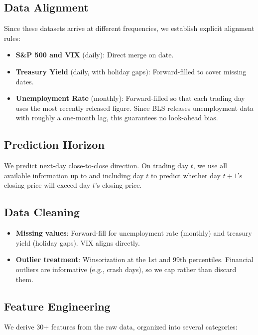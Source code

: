 \documentclass[11pt]{article}
\begin{document}
\subsection{Data Alignment}

Since these datasets arrive at different frequencies, we establish explicit alignment rules:

\begin{itemize}
    \item \textbf{S\&P 500 and VIX} (daily): Direct merge on date.
    \item \textbf{Treasury Yield} (daily, with holiday gaps): Forward-filled to cover missing dates.
    \item \textbf{Unemployment Rate} (monthly): Forward-filled so that each trading day uses the most recently released figure. Since BLS releases unemployment data with roughly a one-month lag, this guarantees no look-ahead bias.
\end{itemize}

\subsection{Prediction Horizon}

We predict next-day close-to-close direction. On trading day $t$, we use all available information up to and including day $t$ to predict whether day $t+1$'s closing price will exceed day $t$'s closing price.

\subsection{Data Cleaning}

\begin{itemize}
    \item \textbf{Missing values}: Forward-fill for unemployment rate (monthly) and treasury yield (holiday gaps). VIX aligns directly.
    \item \textbf{Outlier treatment}: Winsorization at the 1st and 99th percentiles. Financial outliers are informative (e.g., crash days), so we cap rather than discard them.
\end{itemize}

\subsection{Feature Engineering}

We derive 30+ features from the raw data, organized into several categories:
\end{document}
